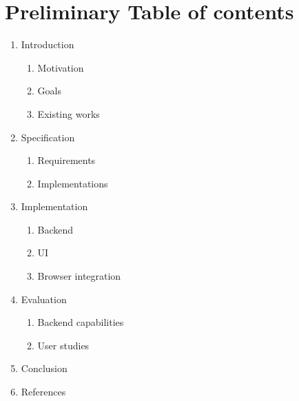 \section{Preliminary Table of contents}

{
    \renewcommand{\labelenumii}{\theenumii}
    \renewcommand{\theenumii}{\theenumi.\arabic{enumii}.}

    \begin{enumerate}[noitemsep]
        \item Introduction
            \begin{enumerate}[noitemsep]
                \item Motivation
                \item Goals
                \item Existing works
            \end{enumerate}

        \item Specification
            \begin{enumerate}[noitemsep]
                \item Requirements
                \item Implementations
            \end{enumerate}

        \item Implementation
            \begin{enumerate}[noitemsep]
                \item Backend
                \item UI
                \item Browser integration
            \end{enumerate}

        \item Evaluation
            \begin{enumerate}[noitemsep]
                \item Backend capabilities
                \item User studies
            \end{enumerate}

        \item Conclusion
        \item References
    \end{enumerate}
}
